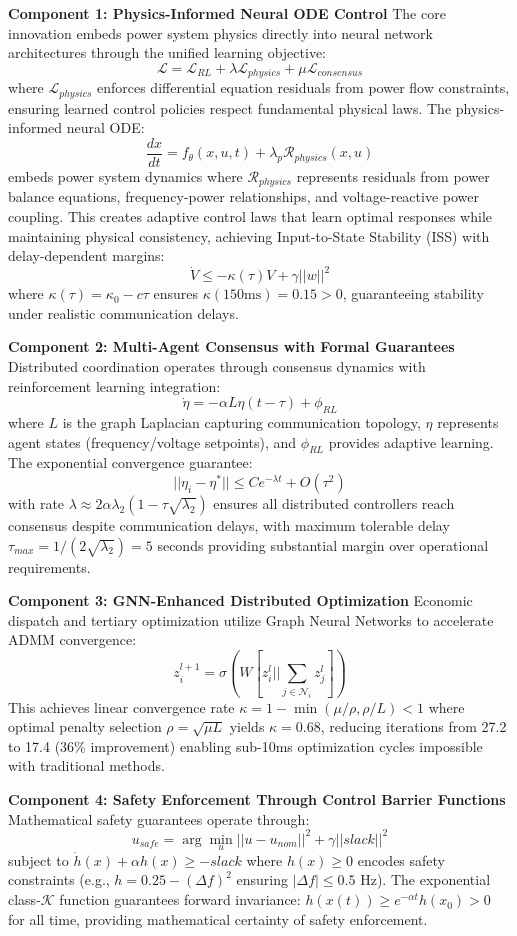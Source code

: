 \documentclass[12pt]{article}
\begin{document}
\textbf{Component 1: Physics-Informed Neural ODE Control}
The core innovation embeds power system physics directly into neural network architectures through the unified learning objective:
$$\mathcal{L} = \mathcal{L}_{RL} + \lambda \mathcal{L}_{physics} + \mu \mathcal{L}_{consensus}$$
where $\mathcal{L}_{physics}$ enforces differential equation residuals from power flow constraints, ensuring learned control policies respect fundamental physical laws. The physics-informed neural ODE:
$$\frac{dx}{dt} = f_\theta(x, u, t) + \lambda_p \mathcal{R}_{physics}(x, u)$$
embeds power system dynamics where $\mathcal{R}_{physics}$ represents residuals from power balance equations, frequency-power relationships, and voltage-reactive power coupling. This creates adaptive control laws that learn optimal responses while maintaining physical consistency, achieving Input-to-State Stability (ISS) with delay-dependent margins:
$$\dot{V} \leq -\kappa(\tau)V + \gamma||w||^2$$
where $\kappa(\tau) = \kappa_0 - c\tau$ ensures $\kappa(150\text{ms}) = 0.15 > 0$, guaranteeing stability under realistic communication delays.

\textbf{Component 2: Multi-Agent Consensus with Formal Guarantees}
Distributed coordination operates through consensus dynamics with reinforcement learning integration:
$$\dot{\eta} = -\alpha L \eta(t-\tau) + \phi_{RL}$$
where $L$ is the graph Laplacian capturing communication topology, $\eta$ represents agent states (frequency/voltage setpoints), and $\phi_{RL}$ provides adaptive learning. The exponential convergence guarantee:
$$||\eta_i - \eta^*|| \leq Ce^{-\lambda t} + O(\tau^2)$$
with rate $\lambda \approx 2\alpha\lambda_2(1 - \tau\sqrt{\lambda_2})$ ensures all distributed controllers reach consensus despite communication delays, with maximum tolerable delay $\tau_{max} = 1/(2\sqrt{\lambda_2}) = 5$ seconds providing substantial margin over operational requirements.

\textbf{Component 3: GNN-Enhanced Distributed Optimization}
Economic dispatch and tertiary optimization utilize Graph Neural Networks to accelerate ADMM convergence:
$$z_i^{l+1} = \sigma(W[z_i^l || \sum_{j \in \mathcal{N}_i} z_j^l])$$
This achieves linear convergence rate $\kappa = 1 - \min(\mu/\rho, \rho/L) < 1$ where optimal penalty selection $\rho = \sqrt{\mu L}$ yields $\kappa = 0.68$, reducing iterations from 27.2 to 17.4 (36\% improvement) enabling sub-10ms optimization cycles impossible with traditional methods.

\textbf{Component 4: Safety Enforcement Through Control Barrier Functions}
Mathematical safety guarantees operate through:
$$u_{safe} = \arg\min_u ||u - u_{nom}||^2 + \gamma||slack||^2$$
subject to $\dot{h}(x) + \alpha h(x) \geq -slack$
where $h(x) \geq 0$ encodes safety constraints (e.g., $h = 0.25 - (\Delta f)^2$ ensuring $|\Delta f| \leq 0.5$ Hz). The exponential class-$\mathcal{K}$ function guarantees forward invariance: $h(x(t)) \geq e^{-\alpha t}h(x_0) > 0$ for all time, providing mathematical certainty of safety enforcement.
\end{document}

